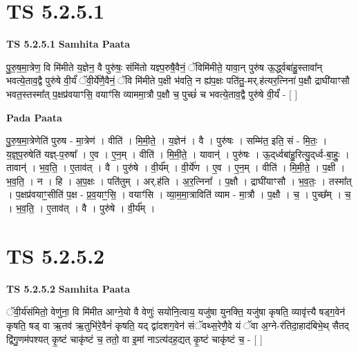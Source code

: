 \documentclass[17pt]{extarticle}
\begin{document}
\section*{ TS 5.2.5.1 }

\textbf{TS 5.2.5.1 } \newline
\textbf{Samhita Paata} \newline

पु॒रु॒ष॒मा॒त्रेण॒ वि मि॑मीते य॒ज्ञेन॒ वै पुरु॑षः॒ संमि॑तो यज्ञ्प॒रुषै॒वैनं॒ ॅविमि॑मीते॒ यावा॒न् पुरु॑ष ऊ॒र्द्ध्वबा॑हु॒स्तावा᳚न् भवत्ये॒ताव॒द्वै पुरु॑षे वी॒र्यं॑ ॅवी॒र्ये॑णै॒वैनं॒ ॅवि मि॑मीते प॒क्षी भ॑वति॒ न ह्य॑प॒क्षः पति॑तु॒-मर्.ह॑त्यर॒त्निना॑ प॒क्षौ द्राघी॑याꣳसौ भवत॒स्तस्मा᳚त् प॒क्षप्र॑वयाꣳसि॒ वयाꣳ॑सि व्याममा॒त्रौ प॒क्षौ च॒ पुच्छं॑ च भवत्ये॒ताव॒द्वै पुरु॑षे वी॒र्यं॑ - [  ] \newline

\textbf{Pada Paata} \newline

पु॒रु॒ष॒मा॒त्रेणेति॑ पुरुष - मा॒त्रेण॑ । वीति॑ । मि॒मी॒ते॒ । य॒ज्ञेन॑ । वै । पुरु॑षः । सम्मि॑त॒ इति॒ सं - मि॒तः॒ । य॒ज्ञ्॒प॒रुषेति॑ यज्ञ्-प॒रुषा᳚ । ए॒व । ए॒न॒म् । वीति॑ । मि॒मी॒ते॒ । यावान्॑ । पुरु॑षः । ऊ॒द्‌र्ध्वबा॑हु॒रित्यु॒द्‌र्ध्व-बा॒हुः॒ । तावान्॑ । भ॒व॒ति॒ । ए॒ताव॑त् । वै । पुरु॑षे । वी॒र्य᳚म् । वी॒र्ये॑ण । ए॒व । ए॒न॒म् । वीति॑ । मि॒मी॒ते॒ । प॒क्षी । भ॒व॒ति॒ । न । हि । अ॒प॒क्षः । पति॑तुम् । अर्.ह॑ति । अ॒र॒त्निना᳚ । प॒क्षौ । द्राघी॑याꣳसौ । भ॒व॒तः॒ । तस्मा᳚त् । प॒क्षप्र॑वयाꣳ॒॒सीति॑ प॒क्ष - प्र॒व॒याꣳ॒॒सि॒ । वयाꣳ॑सि । व्या॒म॒मा॒त्राविति॑ व्याम - मा॒त्रौ । प॒क्षौ । च॒ । पुच्छ᳚म् । च॒ । भ॒व॒ति॒ । ए॒ताव॑त् । वै । पुरु॑षे । वी॒र्य᳚म् ।  \newline




\section*{ TS 5.2.5.2 }

\textbf{TS 5.2.5.2 } \newline
\textbf{Samhita Paata} \newline

ॅवी॒र्य॑संमितो॒ वेणु॑ना॒ वि मि॑मीत आग्ने॒यो वै वेणुः॑ सयोनि॒त्वाय॒ यजु॑षा युनक्ति॒ यजु॑षा कृषति॒ व्यावृ॑त्त्यै षड्ग॒वेन॑ कृषति॒ षड् वा ऋ॒तव॑ ऋ॒तुभि॑रे॒वैनं॑ कृषति॒ यद् द्वा॑दशग॒वेन॑ संॅवथ्स॒रेणै॒वे यं ॅवा अ॒ग्ने-र॑तिदा॒हाद॑बिभे॒थ् सैतद् द्वि॑गु॒णम॑पश्यत् कृ॒ष्टं चाकृ॑ष्टं च॒ ततो॒ वा इ॒मां नाऽत्य॑दह॒द्यत् कृ॒ष्टं चाकृ॑ष्टं च॒ - [  ] \newline
\end{document}
